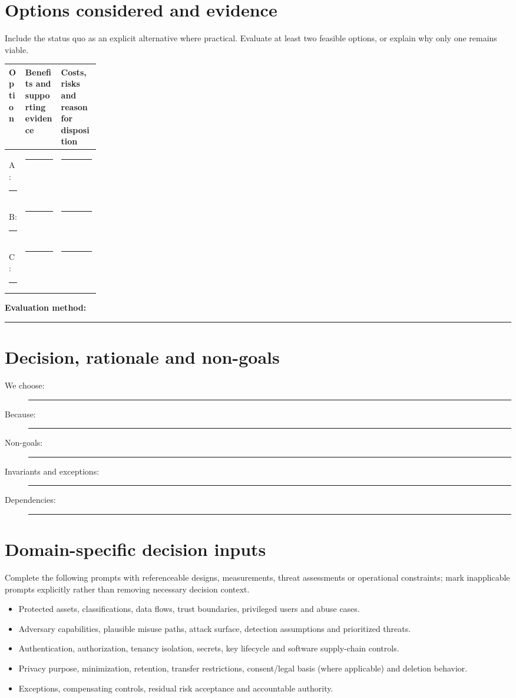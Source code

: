 \documentclass[11pt,letterpaper]{article}
\newcommand{\BlankResponse}{\rule[-0.4em]{0pt}{2em}\rule{0.65\linewidth}{0.4pt}}
\begin{document}
\section{Options considered and evidence}
Include the status quo as an explicit alternative where practical. Evaluate
at least two feasible options, or explain why only one remains viable.
\par\noindent\begin{tabularx}{\linewidth}{@{}>{\raggedright\arraybackslash}p{0.18\linewidth}>{\raggedright\arraybackslash}X >{\raggedright\arraybackslash}X@{}}
\toprule
\textbf{Option} & \textbf{Benefits and supporting evidence} & \textbf{Costs, risks and reason for disposition}\\
\midrule
A: \BlankResponse & \BlankResponse & \BlankResponse\\
B: \BlankResponse & \BlankResponse & \BlankResponse\\
C: \BlankResponse & \BlankResponse & \BlankResponse\\
\bottomrule
\end{tabularx}\par

\noindent\textbf{Evaluation method:} \BlankResponse

\section{Decision, rationale and non-goals}
\begin{description}
\item[We choose:] \BlankResponse
\item[Because:] \BlankResponse
\item[Non-goals:] \BlankResponse
\item[Invariants and exceptions:] \BlankResponse
\item[Dependencies:] \BlankResponse
\end{description}

\section{Domain-specific decision inputs}
Complete the following prompts with referenceable designs, measurements,
threat assessments or operational constraints; mark inapplicable prompts
explicitly rather than removing necessary decision context.
\begin{itemize}
\item Protected assets, classifications, data flows, trust boundaries, privileged users and abuse cases.
\item Adversary capabilities, plausible misuse paths, attack surface, detection assumptions and prioritized threats.
\item Authentication, authorization, tenancy isolation, secrets, key lifecycle and software supply-chain controls.
\item Privacy purpose, minimization, retention, transfer restrictions, consent/legal basis (where applicable) and deletion behavior.
\item Exceptions, compensating controls, residual risk acceptance and accountable authority.
\end{itemize}
\end{document}
